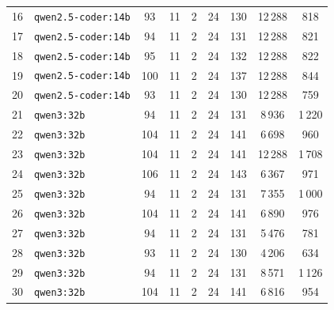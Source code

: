 \begin{table}[htbp]
{\begin{tabular}{|c|l|c|c|c|c|c|c|c|}
16 & \texttt{qwen2.5-coder:14b} &  93 & 11 & 2 & 24 & 130 & 12\,288 & 818 \\
17 & \texttt{qwen2.5-coder:14b} &  94 & 11 & 2 & 24 & 131 & 12\,288 & 821 \\
18 & \texttt{qwen2.5-coder:14b} &  95 & 11 & 2 & 24 & 132 & 12\,288 & 822 \\
19 & \texttt{qwen2.5-coder:14b} & 100 & 11 & 2 & 24 & 137 & 12\,288 & 844 \\
20 & \texttt{qwen2.5-coder:14b} &  93 & 11 & 2 & 24 & 130 & 12\,288 & 759 \\
\hline
21 & \texttt{qwen3:32b} &  94 & 11 & 2 & 24 & 131 &  8\,936 & 1\,220 \\
22 & \texttt{qwen3:32b} & 104 & 11 & 2 & 24 & 141 &  6\,698 &   960 \\
23 & \texttt{qwen3:32b} & 104 & 11 & 2 & 24 & 141 & 12\,288 & 1\,708 \\
24 & \texttt{qwen3:32b} & 106 & 11 & 2 & 24 & 143 &  6\,367 &   971 \\
25 & \texttt{qwen3:32b} &  94 & 11 & 2 & 24 & 131 &  7\,355 & 1\,000 \\
26 & \texttt{qwen3:32b} & 104 & 11 & 2 & 24 & 141 &  6\,890 &   976 \\
27 & \texttt{qwen3:32b} &  94 & 11 & 2 & 24 & 131 &  5\,476 &   781 \\
28 & \texttt{qwen3:32b} &  93 & 11 & 2 & 24 & 130 &  4\,206 &   634 \\
29 & \texttt{qwen3:32b} &  94 & 11 & 2 & 24 & 131 &  8\,571 & 1\,126 \\
30 & \texttt{qwen3:32b} & 104 & 11 & 2 & 24 & 141 &  6\,816 &   954 \\
\hline
\end{tabular}
}%
\label{tab:rohdaten_runs_100}
\end{table}
 
\clearpage
 
\label{app:modell_summary_100}


